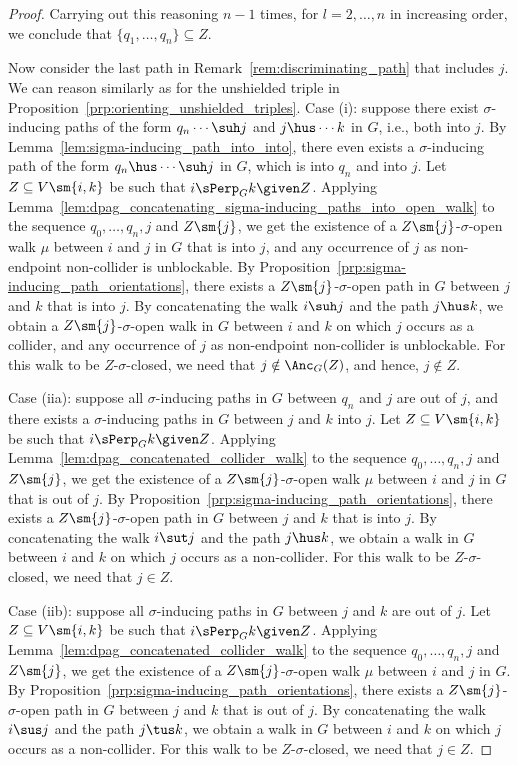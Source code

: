 \begin{proof}
  Carrying out this reasoning $n-1$ times, for $l = 2, \dots, n$ in increasing order, we conclude that $\{q_1,\dots,q_n\} \subseteq Z$.

  Now consider the last path in Remark~\ref{rem:discriminating_path} that includes $j$. 
  We can reason similarly as for the unshielded triple in Proposition~\ref{prp:orienting_unshielded_triples}.
  Case (i): suppose there exist $\sigma$-inducing paths of the form $q_n \cdots \suh j$ and $j \hus \cdots k$ in $G$, i.e., both into $j$. 
  By Lemma~\ref{lem:sigma-inducing_path_into_into}, there even exists a $\sigma$-inducing path of the form $q_n \hus \cdots \suh j$ in $G$, which is into $q_n$ and into $j$.
  Let $Z \subseteq V \sm \{i,k\}$ be such that $i \sPerp_G k \given Z$.
  Applying Lemma~\ref{lem:dpag_concatenating_sigma-inducing_paths_into_open_walk} to the sequence $q_0,\dots,q_n,j$ and $Z\sm\{j\}$, we get the existence of a $Z\sm\{j\}$-$\sigma$-open walk $\mu$ between $i$ and $j$ in $G$ that is into $j$, and any occurrence of $j$ as non-endpoint non-collider is unblockable.
  By Proposition~\ref{prp:sigma-inducing_path_orientations}, there exists a $Z \sm \{j\}$-$\sigma$-open path in $G$ between $j$ and $k$ that is into $j$.
  By concatenating the walk $i \suh j$ and the path $j \hus k$, we obtain a $Z \sm \{j\}$-$\sigma$-open walk in $G$ between $i$ and $k$ on which $j$ occurs as a collider, and any occurrence of $j$ as non-endpoint non-collider is unblockable.
  For this walk to be $Z$-$\sigma$-closed, we need that $j \notin \Anc_G(Z)$, and hence, $j \notin Z$.

  Case (iia): suppose all $\sigma$-inducing paths in $G$ between $q_n$ and $j$ are out of $j$, and there exists a $\sigma$-inducing paths in $G$ between $j$ and $k$ into $j$.
  Let $Z \subseteq V \sm \{i,k\}$ be such that $i \sPerp_G k \given Z$.
  Applying Lemma~\ref{lem:dpag_concatenated_collider_walk} to the sequence $q_0,\dots,q_n,j$ and $Z\sm\{j\}$, we get the existence of a $Z\sm\{j\}$-$\sigma$-open walk $\mu$ between $i$ and $j$ in $G$ that is out of $j$.
  By Proposition~\ref{prp:sigma-inducing_path_orientations}, there exists a $Z \sm \{j\}$-$\sigma$-open path in $G$ between $j$ and $k$ that is into $j$.
  By concatenating the walk $i \sut j$ and the path $j \hus k$, we obtain a walk in $G$ between $i$ and $k$ on which $j$ occurs as a non-collider.
  For this walk to be $Z$-$\sigma$-closed, we need that $j \in Z$.

  Case (iib): suppose all $\sigma$-inducing paths in $G$ between $j$ and $k$ are out of $j$.
  Let $Z \subseteq V \sm \{i,k\}$ be such that $i \sPerp_G k \given Z$.
  Applying Lemma~\ref{lem:dpag_concatenated_collider_walk} to the sequence $q_0,\dots,q_n,j$ and $Z\sm\{j\}$, we get the existence of a $Z\sm\{j\}$-$\sigma$-open walk $\mu$ between $i$ and $j$ in $G$.
  By Proposition~\ref{prp:sigma-inducing_path_orientations}, there exists a $Z \sm \{j\}$-$\sigma$-open path in $G$ between $j$ and $k$ that is out of $j$.
  By concatenating the walk $i \sus j$ and the path $j \tus k$, we obtain a walk in $G$ between $i$ and $k$ on which $j$ occurs as a non-collider.
  For this walk to be $Z$-$\sigma$-closed, we need that $j \in Z$.


\end{proof}
